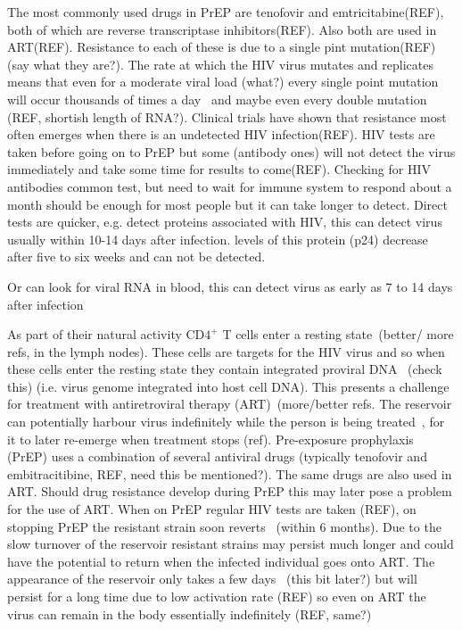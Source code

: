\documentclass[DIV=15]{scrartcl}
\begin{document}
The most commonly used  drugs in PrEP  are tenofovir and emtricitabine(REF), both of which are reverse transcriptase inhibitors(REF).  Also both are used in ART(REF). Resistance to each of these  is due to a single pint mutation(REF)(say what they are?). The rate at which the HIV virus mutates and replicates means that even for a moderate viral load (what?) every single point mutation will occur thousands of times a day~\cite{coffin1995} and maybe even every double mutation (REF, shortish length of RNA?). Clinical trials have shown that resistance most often emerges when there is an undetected HIV infection(REF). HIV tests are taken before going on to PrEP but some (antibody ones) will not detect the virus immediately and take some time for results to come(REF). Checking for HIV antibodies common test, but need to wait for immune system to respond about a month should be enough for most people but it can take longer to detect. Direct tests are quicker, e.g. detect proteins associated with HIV, this can detect virus usually within 10-14 days after infection. levels of this protein (p24) decrease after five to six weeks and can not be detected. 

Or can look for viral RNA in blood, this can detect virus as early as  7 to 14 days after infection


As part of their natural activity CD$4^+$ T  cells enter a resting state~\cite{bukrinsky1991}(better/ more refs, in the lymph nodes). These cells are targets for the HIV virus and so when these cells enter the resting state they contain integrated  proviral  DNA~ \cite{chun1997,finzi1997}(check this) (i.e. virus genome integrated into host cell DNA).  This presents a challenge for treatment with antiretroviral therapy (ART)~\cite{chun2015}(more/better refs. 
The reservoir can potentially harbour virus indefinitely while the person is being treated~\cite{siliciano2003,crooks2015}, for  it to later re-emerge when treatment stops (ref).
Pre-exposure prophylaxis (PrEP) uses a combination of several antiviral drugs (typically tenofovir and embitracitibine, REF, need this be mentioned?). The same drugs are also used in ART. Should drug resistance develop during PrEP this may later pose a problem for the use of ART.  When on PrEP regular HIV tests are taken (REF), on stopping PrEP the resistant strain  soon reverts~\cite{weis2016} (within 6 months). 
Due to the slow turnover of the reservoir resistant strains may persist much longer and could have the potential to return when the infected individual goes onto ART.
The appearance of the reservoir   only takes a few days~\cite{sompayrac2011} (this bit later?) but will persist for a long time due to low activation rate \cite{finzi1999} (REF) so even on ART the virus can remain in the body essentially indefinitely (REF, same?)
\end{document}
